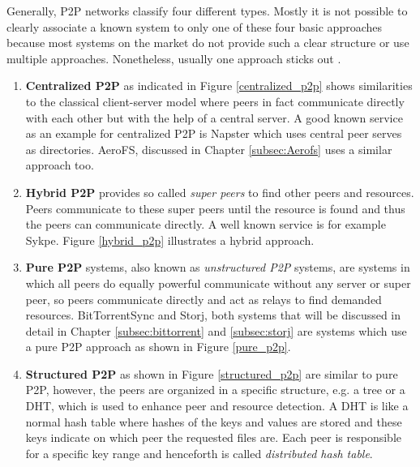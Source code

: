Generally, P2P networks classify four different types. Mostly it is not possible to clearly associate a known system to only one of these four basic approaches because most systems on the market do not provide such a clear structure or use multiple approaches. Nonetheless, usually one approach sticks out \cite{openp2p:p2p_introduction}.
\begin{enumerate}
	\item \textbf{Centralized P2P} as indicated in Figure \ref{centralized_p2p} shows similarities to the classical client-server model where peers in fact communicate directly with each other but with the help of a central server. A good known service as an example for centralized P2P is Napster which uses central peer serves as directories. AeroFS, discussed in Chapter \ref{subsec:Aerofs} uses a similar approach too.

	\item \textbf{Hybrid P2P} provides so called \textit{super peers} to find other peers and resources. Peers communicate to these super peers until the resource is found and thus the peers can communicate directly. A well known service is for example Sykpe. Figure \ref{hybrid_p2p} illustrates a hybrid approach.
	
	\item \textbf{Pure P2P} systems, also known as \textit{unstructured P2P} systems, are systems in which all peers do equally powerful communicate without any server or super peer, so peers communicate directly and act as relays to find demanded resources. BitTorrentSync and Storj, both systems that will be discussed in detail in Chapter \ref{subsec:bittorrent} and \ref{subsec:storj} are systems which use a pure P2P approach as shown in Figure \ref{pure_p2p}.
	
	\item \textbf{Structured P2P} as shown in Figure \ref{structured_p2p} are similar to pure P2P, however, the peers are organized in a specific structure, e.g. a tree or a DHT, which is used to enhance peer and resource detection. A DHT is like a normal hash table where hashes of the keys and values are stored and these keys indicate on which peer the requested files are. Each peer is responsible for a specific key range and henceforth is called \textit{distributed hash table}.
\end{enumerate}

